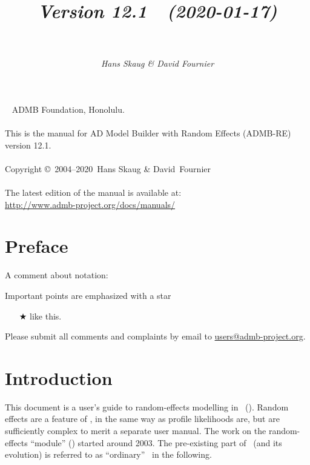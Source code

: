 \documentclass{admbmanual}
\newcommand\admbversion{12.1}
\newcommand\admbyear{2020}
\newcommand\admbdate{2020-01-17}
\begin{document}
\title{%
  \vspace{4.5ex}\textsf{\textit{Version \admbversion~~(\admbdate)\\[3pt]
      ~%
    }}\vspace{3ex}
}
\author{\textsf{\textit{Hans Skaug \& David Fournier}}}

\maketitle

~\vfill
\noindent ADMB Foundation, Honolulu.\\\\
\noindent This is the manual for AD Model Builder with Random Effects (ADMB-RE)
version \admbversion.\\\\
\noindent Copyright \copyright\ 2004--\admbyear\ Hans Skaug \& David~Fournier\\\\
\noindent The latest edition of the manual is available at:\\
\url{http://www.admb-project.org/docs/manuals/}

\tableofcontents

\chapter*{Preface}

A comment about notation:

Important points are emphasized with a star
\begin{itemize}
  \item[$\bigstar$] like this.
\end{itemize}

Please submit all comments and complaints by email to
\href{mailto:users@admb-project.org}{users@admb-project.org}.

\chapter{Introduction}

This document is a user's guide to random-effects modelling in \ADM\ (\scAB).
Random effects are a feature of \scAB, in the same way as profile likelihoods
are, but are sufficiently complex to merit a separate user manual. The work on
the random-effects ``module'' (\scAR) started around 2003. The pre-existing part
of \scAB\ (and its evolution) is referred to as ``ordinary'' \scAB\ in the
following.
\end{document}
